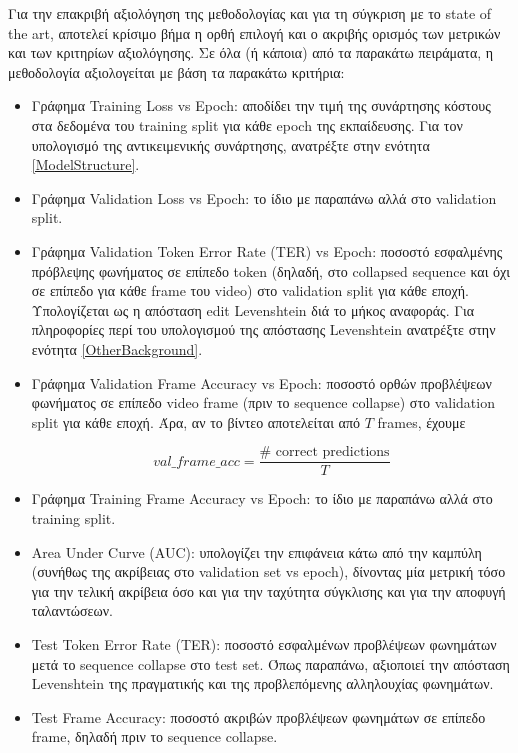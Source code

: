 Για την επακριβή αξιολόγηση της μεθοδολογίας και για τη σύγκριση με το state of the art, αποτελεί κρίσιμο βήμα η ορθή επιλογή και ο ακριβής ορισμός των μετρικών και των κριτηρίων αξιολόγησης. Σε όλα (ή κάποια) από τα παρακάτω πειράματα, η μεθοδολογία αξιολογείται με βάση τα παρακάτω κριτήρια:

\begin{itemize}

\item Γράφημα Training Loss vs Epoch: αποδίδει την τιμή της συνάρτησης κόστους στα δεδομένα του training split για κάθε epoch της εκπαίδευσης. Για τον υπολογισμό της αντικειμενικής συνάρτησης, ανατρέξτε στην ενότητα \ref{ModelStructure}.

\item Γράφημα Validation Loss vs Epoch: το ίδιο με παραπάνω αλλά στο validation split.

\item Γράφημα Validation Token Error Rate (TER) vs Epoch: ποσοστό εσφαλμένης πρόβλεψης φω\-νή\-μα\-τος σε επίπεδο token (δηλαδή, στο collapsed sequence και όχι σε επίπεδο για κάθε frame του video) στο validation split για κάθε εποχή. Υπολογίζεται ως η απόσταση edit Levenshtein διά το μήκος αναφοράς. Για πληροφορίες περί του υπολογισμού της απόστασης Levenshtein ανατρέξτε στην ενότητα \ref{OtherBackground}.

\item Γράφημα Validation Frame Accuracy vs Epoch: ποσοστό ορθών προβλέψεων φωνήματος σε επίπεδο video frame (πριν το sequence collapse) στο validation split για κάθε εποχή. Άρα, αν το βίντεο αποτελείται από $T$ frames, έχουμε 

\[
val\_frame\_acc = \frac{\# \text{ correct predictions}}{T}
\]

\item Γράφημα Training Frame Accuracy vs Epoch: το ίδιο με παραπάνω αλλά στο training split.

\item Area Under Curve (AUC): υπολογίζει την επιφάνεια κάτω από την καμπύλη (συνήθως της ακρίβειας στο validation set vs epoch), δίνοντας μία μετρική τόσο για την τελική ακρίβεια όσο και για την ταχύτητα σύγκλισης και για την αποφυγή ταλαντώσεων. 

\item Test Token Error Rate (TER): ποσοστό εσφαλμένων προβλέψεων φωνημάτων μετά το sequence collapse στο test set. Όπως παραπάνω, αξιοποιεί την απόσταση Levenshtein της πραγματικής και της προβλεπόμενης αλληλουχίας φωνημάτων.

\item Test Frame Accuracy: ποσοστό ακριβών προβλέψεων φωνημάτων σε επίπεδο frame, δηλαδή πριν το sequence collapse. 

\end{itemize}

